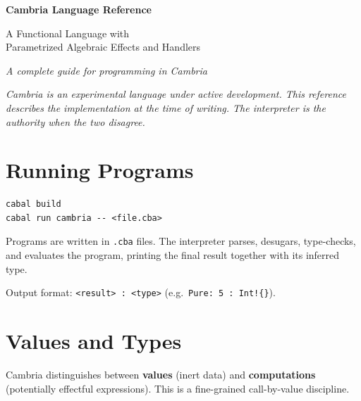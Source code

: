 \documentclass[11pt,a4paper]{article}
\begin{document}
\begin{titlepage}
\centering
\vspace*{4cm}
{\Huge\bfseries Cambria Language Reference\par}
\vspace{1.5cm}
{\Large A Functional Language with\\[4pt]
Parametrized Algebraic Effects and Handlers\par}
\vspace{3cm}
{\large\itshape A complete guide for programming in Cambria\par}
\vfill
\begin{minipage}{0.8\textwidth}
\small\itshape
Cambria is an experimental language under active development.
This reference describes the implementation at the time of writing.
The interpreter is the authority when the two disagree.
\end{minipage}
\vspace{1.5cm}
\end{titlepage}

\tableofcontents
\newpage

\section{Running Programs}
\label{sec:running}

\begin{lstlisting}[style=bash]
cabal build
cabal run cambria -- <file.cba>
\end{lstlisting}

Programs are written in \texttt{.cba} files.  The interpreter parses, desugars,
type-checks, and evaluates the program, printing the final result together with
its inferred type.

Output format: \texttt{<result> : <type>} (e.g.\ \texttt{Pure: 5 : Int!\{\}}).

\section{Values and Types}
\label{sec:types}

Cambria distinguishes between \textbf{values} (inert data) and
\textbf{computations} (potentially effectful expressions).  This is a
fine-grained call-by-value discipline.
\end{document}
